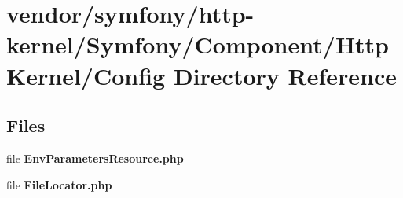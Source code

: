\section{vendor/symfony/http-\/kernel/\+Symfony/\+Component/\+Http\+Kernel/\+Config Directory Reference}
\label{dir_fb29243329c4c0408b239986e726dad6}
\subsection*{Files}
\begin{DoxyCompactItemize}
\item 
file {\bf Env\+Parameters\+Resource.\+php}
\item 
file {\bf File\+Locator.\+php}
\end{DoxyCompactItemize}
